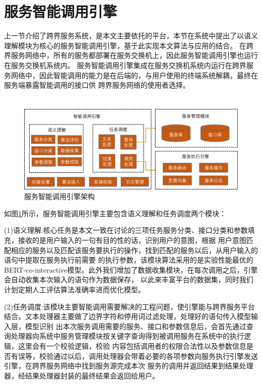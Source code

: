   
  
  
\section{服务智能调用引擎}
上一节介绍了跨界服务系统，是本文主要依托的平台，本节在系统中提出了以语义理解模块为核心的服务智能调用引擎，基于此实现本文算法与应用的结合。
在跨界服务网络中，所有的服务都部署在服务交换机上，因此服务智能调用引擎也运行在服务交换机系统内。
服务智能调用引擎集成在服务交换机系统内运行在跨界服务网络中，因此智能调用的能力是在后端的，与用户使用的终端系统解耦，最终在服务端暴露智能调用的接口供
跨界服务网络的使用者选择。

\begin{figure}[htbp]
  \centering
  \includegraphics[width=15cm]{./images/yinqing.png}
  \caption{服务智能调用引擎架构}
  \label{fig:yinqing}
\end{figure}

如图\ref{fig:yinqing}所示，服务智能调用引擎主要包含语义理解和任务调度两个模块：

(1)语义理解:核心任务是本文一致在讨论的三项任务服务分类、接口分类和参数填充，接收的是用户输入的一句有目的性的话，识别用户的意图，根据
用户意图匹配相应的服务以及匹配该服务要执行的操作，找到匹配的服务以后，从用户输入的语句中提取在服务执行前需要
的执行参数，该模块算法采用的是实验性能最优的BERT-co-interactive模型。此外我们增加了数据收集模块，在每次调用之后，引擎会自动收集本次输入的语句作为数据保存，
以此来丰富平台的数据集，同时我们计划定期人工评估算法准确率进而优化模型。

(2)任务调度:该模块主要智能调用需要解决的工程问题，使引擎能与跨界服务平台结合。文本处理器主要做了边界字符和停用词过滤处理，处理好的语句传入模型输入层，模型识别
出本次服务调用需要的服务、接口和参数信息后，会首先通过查询处理器向系统中服务管理模块按关键字查询得到被调用服务在系统中的执行逻辑，这里会有一个校验逻辑，校验
内容包括调用者的权限合法性以及参数信息是否有误等，校验通过以后，调用处理器会带着必要的各项参数向服务执行引擎发送引擎，在跨界服务网络中找到服务源完成本次
服务的调用并返回结果到结果处理器，经结果处理器封装的最终结果会返回给用户。

